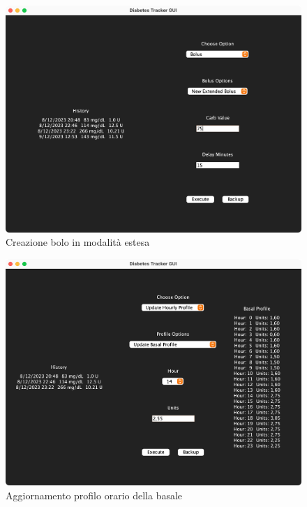\documentclass[twocolumn]{article}
\begin{document}
\begin{figure}
    \centering
    \includegraphics[width=14cm]{gui-bolus-ext.png}
    \caption{Creazione bolo in modalità estesa}
    \label{fig:gui-bolus-ext}
\end{figure}

\begin{figure}
    \centering
    \includegraphics[width=14cm]{gui-basal.png}
    \caption{Aggiornamento profilo orario della basale}
    \label{fig:gui-basal}
\end{figure}
\end{document}
